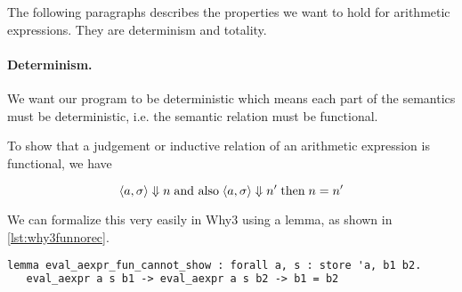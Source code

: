 The following paragraphs describes the properties we want to hold for arithmetic expressions. They are determinism and totality.

\paragraph{Determinism.}
We want our program to be deterministic which means each part of the semantics must be deterministic, i.e. the semantic relation must be functional.

To show that a judgement or inductive relation of an arithmetic expression is functional, we have

\[
  \langle a,\sigma \rangle \Downarrow n \; \text{and also} \; \langle a,\sigma \rangle \Downarrow n' \; \text{then} \; n = n'
\]

We can formalize this very easily in Why3 using a lemma, as shown in \autoref{lst:why3funnorec}.

\begin{lstlisting}[caption={lemma for functional arithmetic expressions},label={lst:why3funnorec},language=sml]
lemma eval_aexpr_fun_cannot_show : forall a, s : store 'a, b1 b2.
   eval_aexpr a s b1 -> eval_aexpr a s b2 -> b1 = b2
\end{lstlisting}


